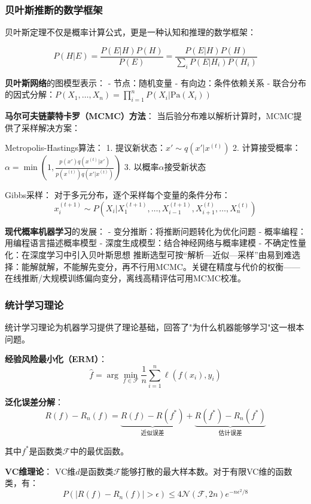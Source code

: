\subsubsection{贝叶斯推断的数学框架}

贝叶斯定理不仅是概率计算公式，更是一种认知和推理的数学框架：

$$P(H|E) = \frac{P(E|H)P(H)}{P(E)} = \frac{P(E|H)P(H)}{\sum_i P(E|H_i)P(H_i)}$$

\textbf{贝叶斯网络}的图模型表示：
- 节点：随机变量
- 有向边：条件依赖关系
- 联合分布的因式分解：$P(X_1, \ldots, X_n) = \prod_{i=1}^n P(X_i|\text{Pa}(X_i))$

\textbf{马尔可夫链蒙特卡罗（MCMC）方法}：
当后验分布难以解析计算时，MCMC提供了采样解决方案：

Metropolis-Hastings算法：
1. 提议新状态：$x' \sim q(x'|x^{(t)})$
2. 计算接受概率：$\alpha = \min\left(1, \frac{p(x')q(x^{(t)}|x')}{p(x^{(t)})q(x'|x^{(t)})}\right)$
3. 以概率$\alpha$接受新状态

Gibbs采样：
对于多元分布，逐个采样每个变量的条件分布：
$$x_i^{(t+1)} \sim P(X_i|X_1^{(t+1)}, \ldots, X_{i-1}^{(t+1)}, X_{i+1}^{(t)}, \ldots, X_n^{(t)})$$

\textbf{现代概率机器学习}的发展：
- 变分推断：将推断问题转化为优化问题
- 概率编程：用编程语言描述概率模型
- 深度生成模型：结合神经网络与概率建模
- 不确定性量化：在深度学习中引入贝叶斯思想
推断选型可按“解析—近似—采样”由易到难选择：能解就解，不能解先变分，再不行用MCMC。关键在精度与代价的权衡——在线推断/大规模训练偏向变分，离线高精评估可用MCMC校准。

\subsubsection{统计学习理论}

统计学习理论为机器学习提供了理论基础，回答了"为什么机器能够学习"这一根本问题。

\textbf{经验风险最小化（ERM）}：
$$\hat{f} = \arg\min_{f \in \mathcal{F}} \frac{1}{n}\sum_{i=1}^n \ell(f(x_i), y_i)$$

\textbf{泛化误差分解}：
$$R(f) - R_n(f) = \underbrace{R(f) - R(f^*)}_{\text{近似误差}} + \underbrace{R(f^*) - R_n(f^*)}_{\text{估计误差}}$$

其中$f^*$是函数类$\mathcal{F}$中的最优函数。

\textbf{VC维理论}：
VC维$d$是函数类$\mathcal{F}$能够打散的最大样本数。对于有限VC维的函数类，有：
$$P\left(|R(f) - R_n(f)| > \epsilon\right) \leq 4\mathcal{N}(\mathcal{F}, 2n)e^{-n\epsilon^2/8}$$

